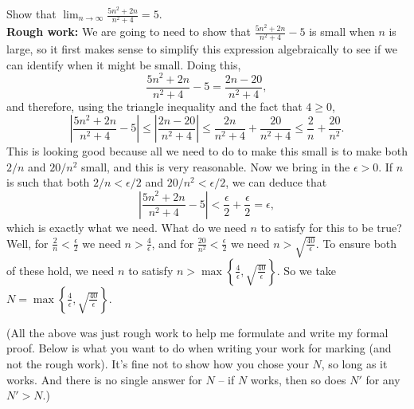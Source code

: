 \documentclass[11pt,dvipsnames]{book}
\numberwithin{figure}{section} %
\numberwithin{table}{section} %
\begin{document}
\begin{example}
Show that $\lim_{n\rightarrow \infty} \frac{5n^2+2n}{n^2+4}=5$. \\
%
%

{\bf Rough work:} We are going to need to show that $ \frac{5n^2+2n}{n^2+4}-5$ is small when $n$ is large, so it first makes sense to simplify this expression algebraically to see if we can identify when it might be small. Doing this,
\[\frac{5n^2+2n}{n^2+4}-5 =\frac{2n-20}{n^2+4},
\]
and therefore, using the triangle inequality and the fact that $4\geq0$,
\[\left|\frac{5n^2+2n}{n^2+4}-5\right|
\leq \left| \frac{2n-20}{n^2+4} \right|
\leq \frac{2n}{n^2 + 4} + \frac{20}{n^2 + 4}
\leq \frac{2}{n} + \frac{20}{n^2}.
\]
This is looking good because all we need to do to make this small is to make both $2/n$ and $20/n^2$ small, and this is very reasonable. Now we bring in the $\epsilon > 0$. If $n$ is such that both $2/n < \epsilon/2$ and $20/n^2 < \epsilon/2$, we can deduce that
\[\left|\frac{5n^2+2n}{n^2+4}-5\right| < \frac{\epsilon}{2}+ \frac{\epsilon}{2} = \epsilon,
\]
which is exactly what we need. What do we need $n$ to satisfy for this to be true? Well, for $\frac{2}{n} < \frac{\epsilon}{2}$ we need $n > \frac{4}{\epsilon}$, and for $\frac{20}{n^2} < \frac{\epsilon}{2}$ we need $n > \sqrt{\frac{40}{\epsilon}}$. To ensure both of these hold, we need $n$ to satisfy $n > \max\left\{\frac{4}{\epsilon}, \sqrt{\frac{40}{\epsilon}}\right\}.$ So we take $N = \max\left\{\frac{4}{\epsilon}, \sqrt{\frac{40}{\epsilon}}\right\}.$

(All the above was just rough work to help me formulate and write my formal proof. Below is what you want to do when writing your work for marking (and not the rough work). It's fine not to show how you chose your $N$, so long as it works. And there is no single answer for $N$ -- if $N$ works, then so does $N'$ for any $N'>N$.)\\


\end{example}
\end{document}
